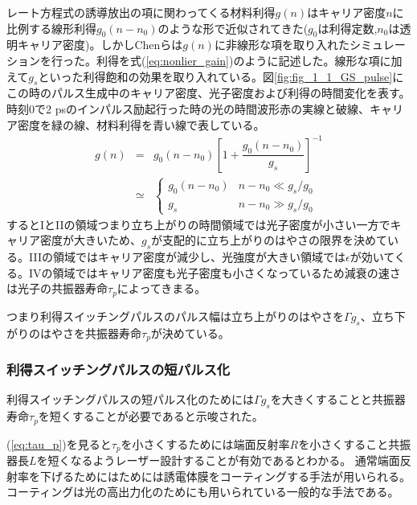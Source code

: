 レート方程式の誘導放出の項に関わってくる材料利得$g(n)$はキャリア密度$n$に比例する線形利得$g_{0}(n-n_{0})$のような形で近似されてきた($g_{0}$は利得定数,$n_{0}$は透明キャリア密度)。しかしChenらは$g(n)$に非線形な項を取り入れたシミュレーションを行った。利得を式(\ref{eq:nonlier_gain})のように記述した。線形な項に加えて$g_{s}$といった利得飽和の効果を取り入れている。図\ref{fig:fig_1_1_GS_pulse}にこの時のパルス生成中のキャリア密度、光子密度および利得の時間変化を表す。時刻0で2 psのインパルス励起行った時の光の時間波形赤の実線と破線、キャリア密度を緑の線、材料利得を青い線で表している。
\begin{eqnarray}
\label{eq:nonlier_gain}
g(n)&=&g_{0}(n-n_{0})\left[1+\dfrac{g_{0}(n-n_{0})}{g_{s}}\right]^{-1}\\
&\simeq &\left\{
\begin{array}{ll}
 g_{0}(n-n_{0}) & n-n_{0}\ll g_{s}/g_{0}\nonumber \\
g_{s} & n-n_{0}\gg g_{s}/g_{0}\nonumber
\end{array}
\right.
\end{eqnarray}
するとIとIIの領域つまり立ち上がりの時間領域では光子密度が小さい一方でキャリア密度が大きいため、$g_{s}$が支配的に立ち上がりのはやさの限界を決めている。IIIの領域ではキャリア密度が減少し、光強度が大きい領域では$\epsilon$が効いてくる。IVの領域ではキャリア密度も光子密度も小さくなっているため減衰の速さは光子の共振器寿命$\tau_{p}$によってきまる。

つまり利得スイッチングパルスのパルス幅は立ち上がりのはやさを$\Gamma g_{s}$、立ち下がりのはやさを共振器寿命$\tau_{p}$が決めている。
\newpage

\subsubsection{利得スイッチングパルスの短パルス化}
利得スイッチングパルスの短パルス化のためには$\Gamma g_{s}$を大きくすることと共振器寿命$\tau_{p}$を短くすることが必要であると示唆された。

(\ref{eq:tau_p})を見ると$\tau_{p}$を小さくするためには端面反射率$R$を小さくすること共振器長$L$を短くなるようレーザー設計することが有効であるとわかる。
通常端面反射率を下げるためにはためには誘電体膜をコーティングする手法が用いられる。コーティングは光の高出力化のためにも用いられている一般的な手法である。


